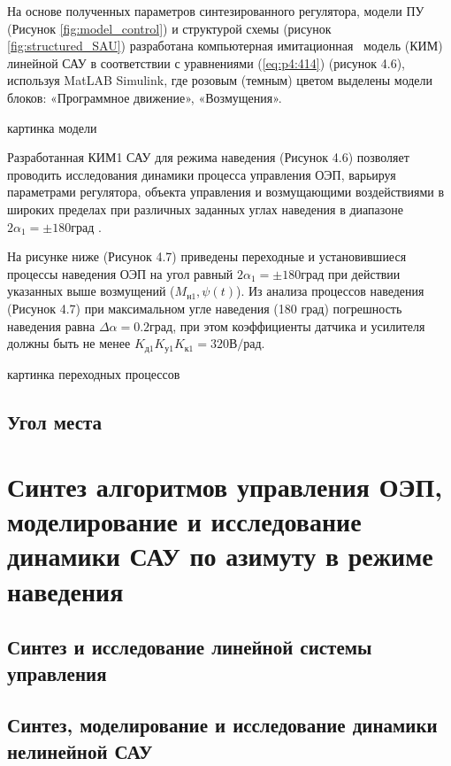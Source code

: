 На основе полученных параметров синтезированного регулятора, модели ПУ (Рисунок \ref{fig:model_control}) и структурой схемы (рисунок \ref{fig:structured_SAU}) разработана компьютерная имитационная \  модель (КИМ) линейной САУ в соответствии с уравнениями (\ref{eq:p4:414}) (рисунок 4.6), используя MatLAB Simulink, где розовым (темным) цветом выделены модели блоков: «Программное движение», «Возмущения». 

 картинка модели 

Разработанная КИМ1 САУ для режима наведения (Рисунок 4.6) позволяет проводить исследования динамики процесса управления ОЭП, варьируя параметрами регулятора, объекта управления и возмущающими воздействиями в широких пределах при различных заданных углах наведения в диапазоне  \( 2 \alpha _{1}= \pm 180 \textit{град} \) .\par

На рисунке ниже (Рисунок 4.7) приведены переходные и установившиеся процессы наведения ОЭП на угол равный \( 2 \alpha _{1}= \pm 180 \textit{град} \) при действии указанных выше возмущений ($M_{\textit{н1}}, \psi(t)$). Из анализа процессов наведения (Рисунок 4.7) при максимальном угле наведения (180 град) погрешность наведения равна $\Delta \alpha = 0.2 \textit{град}$, при этом коэффициенты датчика и усилителя должны быть не менее $K_{\textit{д1}} K_{\textit{у1}} K_{\textit{к1}} = 320 \textit{В/рад}$.

 картинка переходных процессов 






\subsection{Угол места} \label{ch:ch4/sect4-/sub2}

\section{Синтез алгоритмов управления ОЭП, моделирование и исследование динамики САУ по азимуту в режиме наведения} \label{ch:ch4/sect4}


\subsection{Синтез и исследование линейной системы управления} \label{subsec:ch4/sect4/sub1}


\subsection{Синтез, моделирование и исследование динамики нелинейной САУ} \label{subsec:ch4/sect4/sub2}


